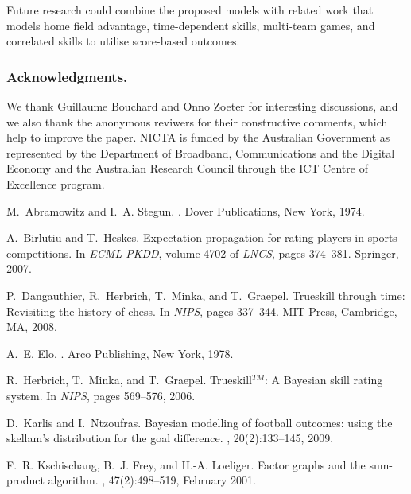 \documentclass[runningheads,a4paper]{llncs}
\begin{document}
Future research could combine the proposed models with
related work that models home field advantage, time-dependent skills,
multi-team games, and correlated skills to utilise score-based
outcomes.
\subsubsection*{Acknowledgments.} We thank Guillaume Bouchard and Onno Zoeter for interesting discussions, and we also thank the anonymous reviwers for their constructive comments, which help to improve the paper. NICTA is funded by the Australian Government as represented by the Department of Broadband, Communications
and the Digital Economy and the Australian Research Council through the ICT Centre of Excellence program.


\begin{thebibliography}{}



M.~Abramowitz and I.~A. Stegun.
.
\newblock Dover Publications, New York, 1974.

A.~Birlutiu and T.~Heskes.
\newblock Expectation propagation for rating players in sports competitions.
\newblock In {\em ECML-PKDD}, volume 4702 of {\em LNCS}, pages
  374--381. Springer, 2007.

P.~Dangauthier, R.~Herbrich, T.~Minka, and T.~Graepel.
\newblock Trueskill through time: Revisiting the history of chess.
\newblock In {\em NIPS}, pages 337--344. MIT
  Press, Cambridge, MA, 2008.

A.~E. Elo.
.
\newblock Arco Publishing, New York, 1978.

R.~Herbrich, T.~Minka, and T.~Graepel.
\newblock Trueskill$^{TM}$: A {B}ayesian skill rating system.
\newblock In {\em NIPS}, pages 569--576, 2006.

D.~Karlis and I.~Ntzoufras.
\newblock Bayesian modelling of football outcomes: using the skellam's
  distribution for the goal difference.
, 20(2):133--145, 2009.

F.~R. Kschischang, B.~J. Frey, and H.-A. Loeliger.
\newblock Factor graphs and the sum-product algorithm.
, 47(2):498--519,
  February 2001.


\end{thebibliography}
\end{document}
